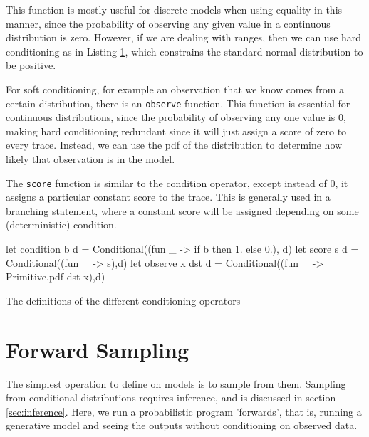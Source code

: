 This function is mostly useful for discrete models when using equality in this manner, since the probability of observing any given value in a continuous distribution is zero. However, if we are dealing with ranges, then we can use hard conditioning as in Listing \ref{lst:half_normal}, which constrains the standard normal distribution to be positive.

\begin{figure}[!htb]
	\begin{minipage}{0.5\textwidth}
		\label{lst:dice}
	\end{minipage}
	\begin{minipage}{0.5\textwidth}
		\label{lst:half_normal}
	\end{minipage}
\end{figure}
			
For soft conditioning, for example an observation that we know comes from a certain distribution, there is an \texttt{observe} function. This function is essential for continuous distributions, since the probability of observing any one value is 0, making hard conditioning redundant since it will just assign a score of zero to every trace. Instead, we can use the pdf of the distribution to determine how likely that observation is in the model.
			
The \texttt{score} function is similar to the condition operator, except instead of 0, it assigns a particular constant score to the trace. This is generally used in a branching statement, where a constant score will be assigned depending on some (deterministic) condition.
				
\begin{listing}[!htb]
	\centering
	\begin{ocamlcode-in}
		let condition b d = Conditional((fun _ -> if b then 1. else 0.), d)
		let score s d = Conditional((fun _ -> s),d)
		let observe x dst d = Conditional((fun _ -> Primitive.pdf dst x),d) 
	\end{ocamlcode-in}	
	\caption{The definitions of the different conditioning operators}
	\label{lst:cond}
\end{listing}
				
\section{Forward Sampling}
The simplest operation to define on models is to sample from them. Sampling from conditional distributions requires inference, and is discussed in section \ref{sec:inference}. Here, we run a probabilistic program 'forwards', that is, running a generative model and seeing the outputs without conditioning on observed data.
					
